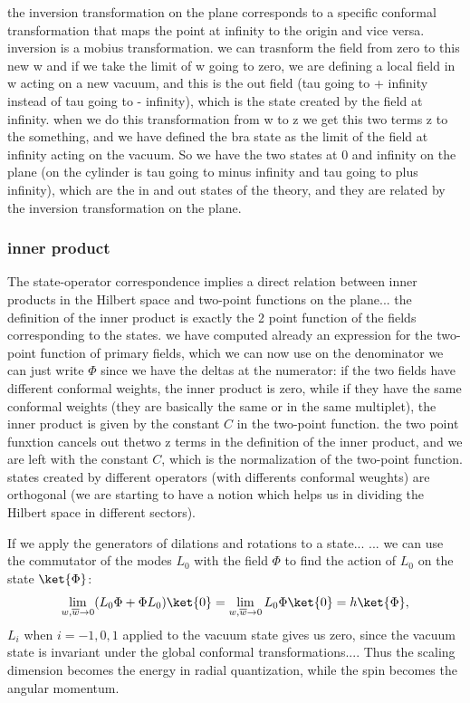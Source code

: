 the inversion transformation on the plane corresponds to a specific conformal transformation that maps the point at infinity to the origin and vice versa. inversion is a mobius transformation.
we can trasnform the field from zero to this new w and if we take the limit of w going to zero, we are defining a local field in w acting on a new vacuum, and this is the out field (tau going to + infinity instead of tau going to - infinity), which is the state created by the field at infinity.
when we do this transformation from w to z we get this two terms z to the something, and we have defined the bra state as the limit of the field at infinity acting on the vacuum. So we have the two states at 0 and infinity on the plane (on the cylinder is tau going to minus infinity and tau going to plus infinity), which are the in and out states of the theory, and they are related by the inversion transformation on the plane.

\subsubsection{inner product}

The state-operator correspondence implies a direct relation between inner products in the Hilbert space and two-point functions on the plane...
the definition of the inner product is exactly the 2 point function of the fields corresponding to the states.
we have computed already an expression for the two-point function of primary fields, which we can now use
on the denominator we can just write \(\Phi\) since we have the deltas at the numerator: if the two fields have different conformal weights, the inner product is zero, while if they have the same conformal weights (they are basically the same or in the same multiplet), the inner product is given by the constant \(C\) in the two-point function.
the two point funxtion cancels out thetwo z terms in the definition of the inner product, and we are left with the constant \(C\), which is the normalization of the two-point function.
states created by different operators (with differents conformal weughts) are orthogonal (we are starting to have a notion which helps us in dividing the Hilbert space in different sectors).

If we apply the generators of dilations and rotations to a state...
...
we can use the commutator of the modes \(L_0\) with the field \(\Phi\) to find the action of \(L_0\) on the state \(\ket{\Phi}\):
\[
    \lim_{w, \overline{w} \to 0} (L_0 \Phi + \Phi L_0) \ket{0} = \lim_{w, \overline{w} \to 0} L_0 \Phi \ket{0} = h \ket{\Phi},
\]
\(L_i\) when \(i=-1,0,1\) applied to the vacuum state gives us zero, since the vacuum state is invariant under the global conformal transformations....
Thus the scaling dimension becomes the energy in radial quantization, while the spin becomes the angular momentum.

